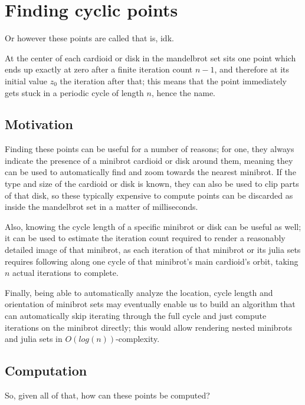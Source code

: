 \documentclass[12pt,a4paper]{article}
\begin{document}
	
\section{Finding cyclic points}

Or however these points are called that is, idk.

At the center of each cardioid or disk in the mandelbrot set sits one point which ends up exactly at zero after a finite iteration count $n-1$, and therefore at its initial value $z_0$ the iteration after that; this means that the point immediately gets stuck in a periodic cycle of length $n$, hence the name.

\subsection{Motivation}

Finding these points can be useful for a number of reasons; for one, they always indicate the presence of a minibrot cardioid or disk around them, meaning they can be used to automatically find and zoom towards the nearest minibrot. If the type and size of the cardioid or disk is known, they can also be used to clip parts of that disk, so these typically expensive to compute points can be discarded as inside the mandelbrot set in a matter of milliseconds.

Also, knowing the cycle length of a specific minibrot or disk can be useful as well; it can be used to estimate the iteration count required to render a reasonably detailed image of that minibrot, as each iteration of that minibrot or its julia sets requires following along one cycle of that minibrot's main cardioid's orbit, taking $n$ actual iterations to complete.

Finally, being able to automatically analyze the location, cycle length and orientation of minibrot sets may eventually enable us to build an algorithm that can automatically skip iterating through the full cycle and just compute iterations on the minibrot directly; this would allow rendering nested minibrots and julia sets in $O(log(n))$-complexity.

\subsection{Computation}

So, given all of that, how can these points be computed?
\end{document}
